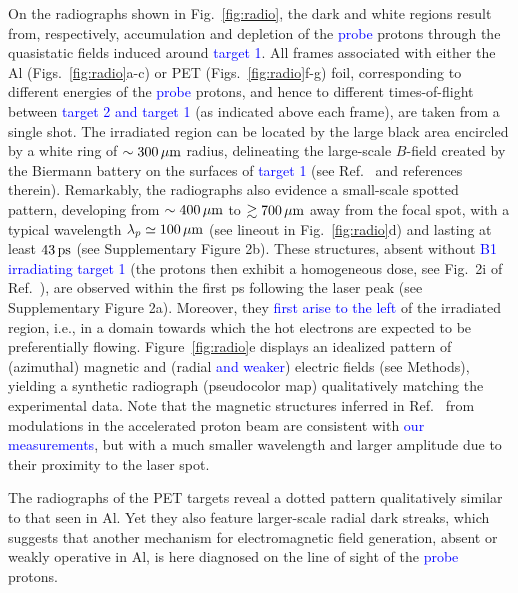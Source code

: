 \documentclass[aps,showpacs,superscriptaddress]{revtex4}
\begin{document}
On the radiographs shown in Fig.~\ref{fig:radio}, the dark and white regions result from, respectively, accumulation and depletion of the \textcolor{blue}{probe} protons through the quasistatic fields induced around \textcolor{blue}{target 1}. All frames associated with either the Al (Figs.~\ref{fig:radio}a-c) or PET (Figs.~\ref{fig:radio}f-g) foil, corresponding to different energies of the \textcolor{blue}{probe} protons, and hence to different times-of-flight between \textcolor{blue}{target 2 and target 1} (as indicated above each frame), are taken from a single shot. The irradiated region can be located by the large black area encircled by a white ring of $\sim 300\,\rm \mu m$ radius, delineating the large-scale $B$-field created by the Biermann battery on the surfaces of \textcolor{blue}{target 1} (see Ref.~\cite{RSI_Albertazzi_2015} and references therein). Remarkably, the radiographs also evidence a small-scale spotted pattern, developing from $\sim 400\,\rm\mu m$ to $\gtrsim 700\,\rm \mu m$ away from the focal spot, with a typical wavelength  $\lambda_p \simeq 100\,\rm \mu m$ (see lineout in Fig.~\ref{fig:radio}d) and lasting at least $43\,\rm ps$ (see Supplementary Figure 2b). These structures, absent without \textcolor{blue}{B1 irradiating target 1} (the protons then exhibit a homogeneous dose, see Fig.~2i of Ref.~\cite{RSI_Albertazzi_2015}), are observed within the first ps following the laser peak (see  Supplementary Figure 2a). Moreover, they \textcolor{blue}{first arise to the left}  
of the irradiated region, i.e., in a domain towards which the hot electrons are expected to be preferentially flowing. Figure~\ref{fig:radio}e displays an idealized pattern of (azimuthal) magnetic and (radial \textcolor{blue}{and weaker}) electric fields (see Methods), yielding a synthetic radiograph (pseudocolor map) qualitatively matching the experimental data. Note that the magnetic structures inferred in Ref.~\cite{PRL_Gode_2017} from modulations in the accelerated proton beam are consistent with \textcolor{blue}{our measurements},
but with a much smaller wavelength and larger amplitude due to their proximity to the laser spot.

The radiographs of the PET targets reveal a dotted pattern qualitatively similar to that seen in Al. Yet they also feature larger-scale radial dark streaks, which suggests that another mechanism for electromagnetic field generation, absent or weakly operative in Al, is here diagnosed on the line of sight of the \textcolor{blue}{probe} protons.
\end{document}
